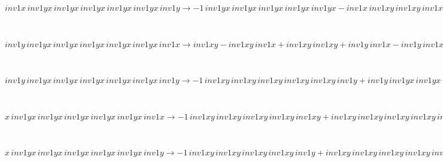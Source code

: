 \begin{minipage}{6in}
$
inv1x\,
 inv1yx\,
 inv1yx\,
 inv1yx\,
 inv1yx\,
 inv1yx\,
 inv1y\rightarrow -1\,
 inv1yx\,
 inv1yx\,
 inv1yx\,
 inv1yx\,
 inv1yx - inv1x\,
 inv1xy\,
 inv1xy\,
 inv1xy\,
 inv1xy\,
 inv1y + inv1x\,
 inv1yx\,
 inv1yx\,
 inv1yx\,
 inv1yx\,
 inv1yx + inv1yx\,
 inv1yx\,
 inv1yx\,
 inv1yx\,
 inv1yx\,
 inv1y + inv1x\,
 inv1xy\,
 inv1xy\,
 inv1xy\,
 inv1xy\,
 inv1xy\,
 inv1y
$
\end{minipage}\medskip \\
\begin{minipage}{6in}
$
inv1y\,
 inv1yx\,
 inv1yx\,
 inv1yx\,
 inv1yx\,
 inv1yx\,
 inv1x\rightarrow inv1xy - inv1xy\,
 inv1x + inv1xy\,
 inv1xy + inv1y\,
 inv1x - inv1y\,
 inv1xy - inv1xy\,
 inv1xy\,
 inv1x + inv1xy\,
 inv1xy\,
 inv1xy + inv1y\,
 inv1xy\,
 inv1x - inv1y\,
 inv1xy\,
 inv1xy - inv1xy\,
 inv1xy\,
 inv1xy\,
 inv1x + inv1xy\,
 inv1xy\,
 inv1xy\,
 inv1xy + inv1y\,
 inv1xy\,
 inv1xy\,
 inv1x - inv1y\,
 inv1xy\,
 inv1xy\,
 inv1xy - inv1xy\,
 inv1xy\,
 inv1xy\,
 inv1xy\,
 inv1x + inv1xy\,
 inv1xy\,
 inv1xy\,
 inv1xy\,
 inv1xy + inv1y\,
 inv1xy\,
 inv1xy\,
 inv1xy\,
 inv1x - inv1y\,
 inv1xy\,
 inv1xy\,
 inv1xy\,
 inv1xy - inv1xy\,
 inv1xy\,
 inv1xy\,
 inv1xy\,
 inv1xy\,
 inv1x + inv1y\,
 inv1xy\,
 inv1xy\,
 inv1xy\,
 inv1xy\,
 inv1x - inv1y\,
 inv1xy\,
 inv1xy\,
 inv1xy\,
 inv1xy\,
 inv1xy + inv1y\,
 inv1xy\,
 inv1xy\,
 inv1xy\,
 inv1xy\,
 inv1xy\,
 inv1x
$
\end{minipage}\medskip \\
\begin{minipage}{6in}
$
inv1y\,
 inv1yx\,
 inv1yx\,
 inv1yx\,
 inv1yx\,
 inv1yx\,
 inv1y\rightarrow -1\,
 inv1xy\,
 inv1xy\,
 inv1xy\,
 inv1xy\,
 inv1xy\,
 inv1y + inv1y\,
 inv1yx\,
 inv1yx\,
 inv1yx\,
 inv1yx\,
 inv1yx + inv1y\,
 inv1xy\,
 inv1xy\,
 inv1xy\,
 inv1xy\,
 inv1xy\,
 inv1y
$
\end{minipage}\medskip \\
\begin{minipage}{6in}
$
x\,
 inv1yx\,
 inv1yx\,
 inv1yx\,
 inv1yx\,
 inv1yx\,
 inv1x\rightarrow -1\,
 inv1xy\,
 inv1xy\,
 inv1xy\,
 inv1xy\,
 inv1xy + inv1xy\,
 inv1xy\,
 inv1xy\,
 inv1xy\,
 inv1xy\,
 inv1x
$
\end{minipage}\medskip \\
\begin{minipage}{6in}
$
x\,
 inv1yx\,
 inv1yx\,
 inv1yx\,
 inv1yx\,
 inv1yx\,
 inv1y\rightarrow -1\,
 inv1xy\,
 inv1xy\,
 inv1xy\,
 inv1xy\,
 inv1y + inv1xy\,
 inv1xy\,
 inv1xy\,
 inv1xy\,
 inv1xy\,
 inv1y + x\,
 inv1yx\,
 inv1yx\,
 inv1yx\,
 inv1yx\,
 inv1yx
$
\end{minipage}\medskip \\
